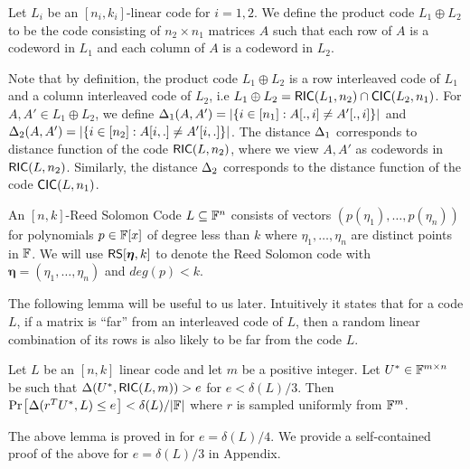 \begin{definition}\label{defn:productcode}
Let $L_i$ be an $[n_i,k_i]$-linear code for $i=1,2$. We define the product code
$L_1\oplus L_2$ to be the code consisting of $n_2\times n_1$ matrices $A$ such
that each row of $A$ is a codeword in $L_1$ and each column of $A$ is a
codeword in $L_2$. 
\end{definition}

Note that by definition, the product code $L_1\oplus L_2$ is a row interleaved
code of $L_1$ and a column interleaved code of $L_2$, i.e $L_1\oplus L_2 =
\mathsf{RIC}(L_1,n_2)\cap \mathsf{CIC}(L_2,n_1)$. For $A,A'\in L_1\oplus L_2$, we define
$\Delta_1(A,A')=|\{i\in [n_1]: A[.,i]\neq A'[.,i]\}|$ and $\Delta_2(A,A')=|\{i\in
[n_2]: A[i,.]\neq A'[i,.]\}|$. The distance $\Delta_1$ corresponds to distance
function of the code $\mathsf{RIC}(L,n_2)$, where we view $A,A'$ as codewords in
$\mathsf{RIC}(L,n_2)$. Similarly, the distance $\Delta_2$ corresponds to the distance
function of the code $\mathsf{CIC}(L,n_1)$.

\begin{definition}\label{defn:rscode}
An $[n,k]$-Reed Solomon Code $L\subseteq \mathbb{F}^n$ consists of vectors
$(p(\eta_1),\ldots,p(\eta_n))$ for polynomials $p\in \mathbb{F}[x]$ of degree less
than $k$ where $\eta_1,\ldots,\eta_n$ are distinct points in $\mathbb{F}$. We will use
$\mathsf{RS}[\bm{\eta},k]$ to denote the Reed Solomon code with
$\bm{\eta}=(\eta_1,\ldots,\eta_n)$ and $deg(p)<k$.
\end{definition}
   
The following lemma will be useful to us later. Intuitively it states that for
a code $L$, if a
matrix is ``far'' from an interleaved code of $L$, then a random linear combination of its
rows is also likely to be far from the code $L$. 

\begin{lemma}\label{lem:proximitytest}
Let $L$ be an $[n,k]$ linear code and let $m$ be a positive integer. Let
$U^\ast\in \mathbb{F}^{m\times n}$ be such that $\Delta(U^\ast,\mathsf{RIC}(L,m))>e$ for
$e<\delta(L)/3$. Then $\prob{\dham(r^TU^\ast,L)\leq e}<\delta(L)/|\FF|$ where
$r$ is sampled uniformly from $\mathbb{F}^m$. 
\end{lemma}
The above lemma is proved in \cite{Ligero2017} for $e=\delta(L)/4$. We provide
a self-contained proof of the above for $e=\delta(L)/3$ in Appendix.


